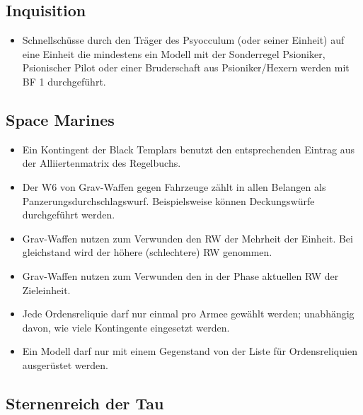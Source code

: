 \subsection{Inquisition}

\begin{itemize}

 \item Schnellschüsse durch den Träger des Psyocculum (oder seiner Einheit) auf
  eine Einheit die mindestens ein Modell mit der Sonderregel Psioniker,
  Psionischer Pilot oder einer Bruderschaft aus Psioniker/Hexern werden mit BF 1
  durchgeführt.

\end{itemize}

\subsection{Space Marines}

\begin{itemize}

 \item Ein Kontingent der Black Templars benutzt den entsprechenden Eintrag aus
  der Alliiertenmatrix des Regelbuchs.

 \item Der W6 von Grav-Waffen gegen Fahrzeuge zählt in allen Belangen als
  Panzerungsdurchschlagswurf. Beispielsweise können Deckungswürfe durchgeführt
  werden.

 \item Grav-Waffen nutzen zum Verwunden den RW der Mehrheit der Einheit. Bei
  gleichstand wird der höhere (schlechtere) RW genommen.

 \item Grav-Waffen nutzen zum Verwunden den in der Phase aktuellen RW der
  Zieleinheit.

 \item Jede Ordensreliquie darf nur einmal pro Armee gewählt werden; unabhängig
  davon, wie viele Kontingente eingesetzt werden.

 \item Ein Modell darf nur mit einem Gegenstand von der Liste für
  Ordensreliquien ausgerüstet werden.

\end{itemize}

\subsection{Sternenreich der Tau}


